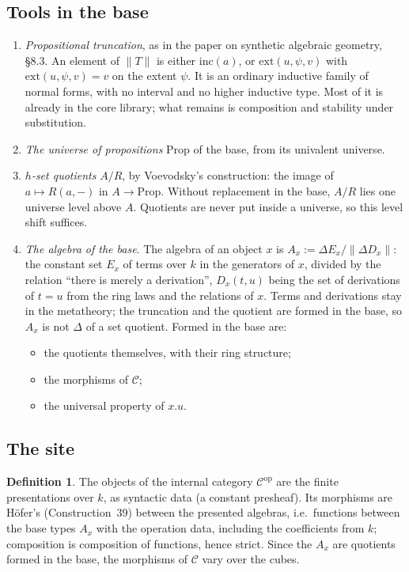 \documentclass[11pt]{amsart}
\theoremstyle{definition}
\newtheorem{definition}[theorem]{Definition}
\theoremstyle{remark}
\newcommand{\Prop}{\mathrm{Prop}}
\begin{document}
\subsection{Tools in the base}
\begin{enumerate}[label=(B\arabic*)]
\item \emph{Propositional truncation}, as in the paper on synthetic
algebraic geometry, \S8.3. An element of $\|T\|$ is either $\mathrm{inc}(a)$,
or $\mathrm{ext}(u,\psi,v)$ with $\mathrm{ext}(u,\psi,v)=v$ on the extent
$\psi$. It is an ordinary inductive family of normal forms, with no
interval and no higher inductive type. Most of it is already in the core
library; what remains is composition and stability under substitution.
\item \emph{The universe of propositions} $\Prop$ of the base, from its
univalent universe.
\item \emph{$h$-set quotients} $A/R$, by Voevodsky's construction: the
image of $a\mapsto R(a,-)$ in $A\to\Prop$. Without replacement in the base,
$A/R$ lies one universe level above $A$. Quotients are never put inside a
universe, so this level shift suffices.
\item \emph{The algebra of the base}. The algebra of an object $x$ is
$A_x := \Delta E_x/\|\Delta D_x\|$: the constant set $E_x$ of terms over
$k$ in the generators of $x$, divided by the relation ``there is merely a
derivation'', $D_x(t,u)$ being the set of derivations of $t=u$ from the
ring laws and the relations of $x$. Terms and derivations stay in the
metatheory; the truncation and the quotient are formed in the base, so
$A_x$ is not $\Delta$ of a set quotient. Formed in the base are:
\begin{itemize}
\item the quotients themselves, with their ring structure;
\item the morphisms of $\mathcal C$;
\item the universal property of $x.u$.
\end{itemize}
\end{enumerate}

\subsection{The site}
\begin{definition}
The objects of the internal category $\mathcal C^{\mathrm{op}}$ are the
finite presentations over $k$, as syntactic data (a constant presheaf).
Its morphisms are H\"ofer's (Construction~39) between the presented
algebras, i.e.\ functions between the base types $A_x$ with the operation
data, including the coefficients from $k$; composition is composition of
functions, hence strict. Since the $A_x$ are quotients formed in the base,
the morphisms of $\mathcal C$ vary over the cubes.
\end{definition}
\end{document}
